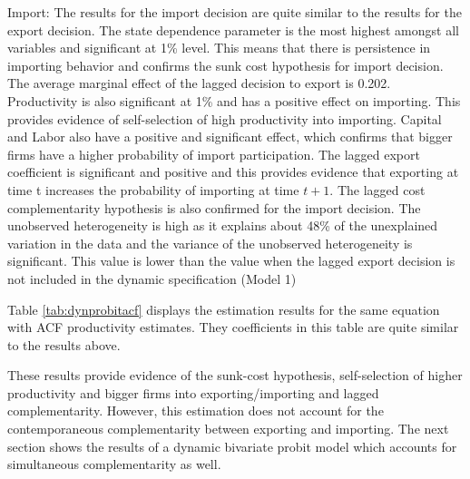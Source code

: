 \documentclass[12pt]{article}
\begin{document}
 Import:  The results for the import decision are quite similar to the
 results for the export decision. The state dependence parameter is the most highest
  amongst all variables and
  significant at 1\% level. This means that there is persistence in
  importing behavior and confirms the sunk cost hypothesis for import decision. The average marginal effect of the lagged
  decision to export is 0.202. Productivity is also significant at 1\%
  and has a 
  positive effect on importing. This provides evidence of
  self-selection of high productivity into importing. Capital and Labor
  also have a positive and significant effect, which confirms that
  bigger firms have a higher probability of import participation.  The lagged export coefficient is
  significant and positive and this provides evidence  that exporting
  at time t increases the probability of importing at time $t+1$. The
  lagged cost complementarity hypothesis is also confirmed for the
  import decision.  The
  unobserved heterogeneity is high as it explains about 48\% of the unexplained
  variation in the data and the variance of the unobserved
  heterogeneity is significant. This value is lower than the value
  when the lagged export decision is not included in the dynamic
  specification (Model 1) 

Table \ref{tab:dynprobitacf} displays the estimation results for the same
equation with ACF productivity estimates. They coefficients in this
table are quite similar to the results above. 

These results provide evidence of the sunk-cost hypothesis,
self-selection of higher productivity and bigger firms into
exporting/importing and lagged complementarity. However, this estimation does not
account for the contemporaneous  complementarity between exporting
and importing. The next section shows the results of a dynamic
bivariate probit model which accounts for simultaneous complementarity
as well. 


  
\end{document}
